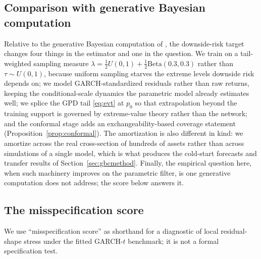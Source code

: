 \documentclass[11pt]{article}
\theoremstyle{remark}
\begin{document}
\subsection{Comparison with generative Bayesian computation}\label{sec:polsondelta}

Relative to the generative Bayesian computation of
\citet{polson2023gbc}, the downside-risk target changes four things in
the estimator and one in the question. We train on a tail-weighted
sampling measure $\lambda = \tfrac12 U(0,1) + \tfrac12
\mathrm{Beta}(0.3,0.3)$ rather than $\tau\sim U(0,1)$, because
uniform sampling starves the extreme levels downside risk depends on;
we model GARCH-standardized residuals rather than raw returns, keeping
the conditional-scale dynamics the parametric model already estimates
well; we splice the GPD tail \eqref{eq:evt} at $p_0$ so that
extrapolation beyond the training support is governed by extreme-value
theory rather than the network; and the conformal stage adds an
exchangeability-based coverage statement
(Proposition~\ref{prop:conformal}). The amortization is also different
in kind: we amortize across the real cross-section of hundreds of
assets rather than across simulations of a single model, which is what
produces the cold-start forecasts and transfer results of
Section~\ref{sec:gbcmethod}. Finally, the empirical question here,
when such machinery improves on the parametric filter, is one
generative computation does not address; the score below answers
it.

\subsection{The misspecification score}\label{sec:score}

We use ``misspecification score'' as shorthand for a diagnostic of local
residual-shape stress under the fitted GARCH-$t$ benchmark; it is not a
formal specification test.
\end{document}
